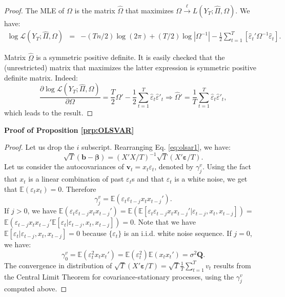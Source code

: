 \documentclass[
  11pt,
]{book}
\theoremstyle{definition}
\theoremstyle{definition}
\theoremstyle{definition}
\theoremstyle{definition}
\theoremstyle{remark}
\begin{document}
\begin{proof}
The MLE of \(\Omega\) is the matrix \(\hat{\Omega}\) that maximizes \(\Omega\overset{\ell}{\rightarrow}L(Y_{T};\hat{\Pi},\Omega)\). We have:
\begin{eqnarray*}
\log\mathcal{L}(Y_{T};\hat{\Pi},\Omega) & = & -(Tn/2)\log(2\pi)+(T/2)\log\left|\Omega^{-1}\right| -\frac{1}{2}\sum_{t=1}^{T}\left[\hat{\varepsilon}_{t}'\Omega^{-1}\hat{\varepsilon}_{t}\right].
\end{eqnarray*}

Matrix \(\hat{\Omega}\) is a symmetric positive definite. It is easily checked that the (unrestricted) matrix that maximizes the latter expression is symmetric positive definite matrix. Indeed:
\[
\frac{\partial \log\mathcal{L}(Y_{T};\hat{\Pi},\Omega)}{\partial\Omega}=\frac{T}{2}\Omega'-\frac{1}{2}\sum_{t=1}^{T}\hat{\varepsilon}_{t}\hat{\varepsilon}'_{t}\Rightarrow\hat{\Omega}'=\frac{1}{T}\sum_{t=1}^{T}\hat{\varepsilon}_{t}\hat{\varepsilon}'_{t},
\]
which leads to the result.
\end{proof}

\textbf{Proof of Proposition \ref{prp:OLSVAR}}

\begin{proof}
Let us drop the \(i\) subscript. Rearranging Eq. \eqref{eq:olsar1}, we have:
\[
\sqrt{T}(\mathbf{b}-\boldsymbol{\beta}) =  (X'X/T)^{-1}\sqrt{T}(X'\boldsymbol\varepsilon/T).
\]
Let us consider the autocovariances of \(\mathbf{v}_t = x_t \varepsilon_t\), denoted by \(\gamma^v_j\). Using the fact that \(x_t\) is a linear combination of past \(\varepsilon_t\)s and that \(\varepsilon_t\) is a white noise, we get that \(\mathbb{E}(\varepsilon_t x_t)=0\). Therefore
\[
\gamma^v_j = \mathbb{E}(\varepsilon_t\varepsilon_{t-j}x_tx_{t-j}').
\]
If \(j>0\), we have \(\mathbb{E}(\varepsilon_t\varepsilon_{t-j}x_tx_{t-j}')=\mathbb{E}(\mathbb{E}[\varepsilon_t\varepsilon_{t-j}x_tx_{t-j}'|\varepsilon_{t-j},x_t,x_{t-j}])=\) \(\mathbb{E}(\varepsilon_{t-j}x_tx_{t-j}'\mathbb{E}[\varepsilon_t|\varepsilon_{t-j},x_t,x_{t-j}])=0\). Note that we have \(\mathbb{E}[\varepsilon_t|\varepsilon_{t-j},x_t,x_{t-j}]=0\) because \(\{\varepsilon_t\}\) is an i.i.d. white noise sequence. If \(j=0\), we have:
\[
\gamma^v_0 = \mathbb{E}(\varepsilon_t^2x_tx_{t}')= \mathbb{E}(\varepsilon_t^2) \mathbb{E}(x_tx_{t}')=\sigma^2\mathbf{Q}.
\]
The convergence in distribution of \(\sqrt{T}(X'\boldsymbol\varepsilon/T)=\sqrt{T}\frac{1}{T}\sum_{t=1}^Tv_t\) results from the Central Limit Theorem for covariance-stationary processes, using the \(\gamma_j^v\) computed above.
\end{proof}
\end{document}
